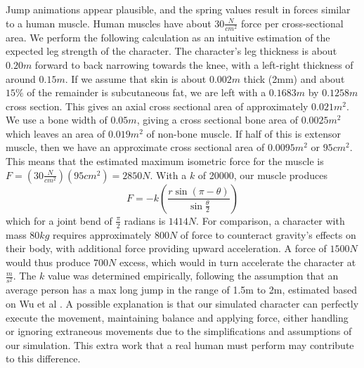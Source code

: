 Jump animations appear plausible, and the spring values result in forces similar to a human muscle.  Human muscles have about $30\frac{N}{cm^2}$ force per cross-sectional area\cite{biomech_sport}. We perform the following calculation as an intuitive estimation of the expected leg strength of the character. The character's leg thickness is about $0.20m$ forward to back narrowing towards the knee, with a left-right thickness of around $0.15m$. If we assume that skin is about $0.002m$ thick (2mm) and about $15\%$ of the remainder is subcutaneous fat, we are left with a $0.1683m$ by $0.1258m$ cross section.  This gives an axial cross sectional area of approximately $0.021m^2$.  We use a bone width of $0.05m$, giving a cross sectional bone area of $0.0025m^2$ which leaves an area of $0.019m^2$ of non-bone muscle.  If half of this is extensor muscle, then we have an approximate cross sectional area of $0.0095m^2$ or $95cm^2$.  This means that the estimated maximum isometric force for the muscle is $F = \left(30 \frac{N}{cm^2}\right) \left(95cm^2\right) = 2850N$.  With a $k$ of 20000, our muscle produces \[
	F = -k \left(\dfrac{r \sin (\pi - \theta)}{\sin \frac{\theta}{2}} \right)
\]
which for a joint bend of $\frac{\pi}{2}$ radians is $1414N$.  For comparison, a character with mass $80kg$ requires approximately $800N$ of force to counteract gravity's effects on their body, with additional force providing upward acceleration.  A force of $1500N$ would thus produce $700N$ excess, which would in turn accelerate the character at $\frac{m}{s^2}$.  The $k$ value was determined empirically, following the assumption that an average person has a max long jump in the range of 1.5m to 2m, estimated based on Wu et al \cite{longjump}.  A possible explanation is that our simulated character can perfectly execute the movement, maintaining balance and applying force, either handling or ignoring extraneous movements due to the simplifications and assumptions of our simulation.  This extra work that a real human must perform may contribute to this difference.

